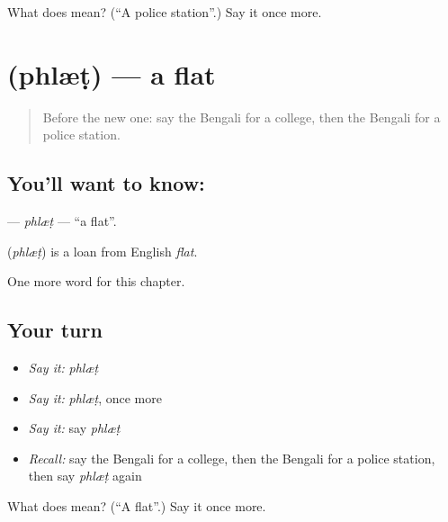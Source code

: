 \begin{tcolorbox}[breakable,colback=teal!4,colframe=teal!35!black,title={Before you move on}]
What does  mean? (\textquotedblleft{}A police station\textquotedblright{}.) Say it once more.
\end{tcolorbox}
\section[\texorpdfstring{\bn{ফ্ল্যাট} (phlæṭ)}{ফ্ল্যাট (phlæṭ)}]{ (phlæṭ) — a flat}

\label{lesson:BN-C188-phlt}



\begin{quote}
Before the new one: say the Bengali for a college, then the Bengali for a police station.
\end{quote}

\subsection*{You'll want to know: }
\textbf{} — \emph{phlæṭ} — \textquotedblleft{}a flat\textquotedblright{}.

\begin{cousinweb}
\textbf{} (\emph{phlæṭ}) is a loan from English \emph{flat}.
\end{cousinweb}

\begin{grammarlens}[title={What you've built}]
One more word for this chapter.
\end{grammarlens}

\subsection*{Your turn}
\begin{itemize}
\raggedright
  \item \emph{Say it:} \emph{phlæṭ}
  \item \emph{Say it:} \emph{phlæṭ}, once more
  \item \emph{Say it:} say \emph{phlæṭ}
  \item \emph{Recall:} say the Bengali for a college, then the Bengali for a police station, then say \emph{phlæṭ} again
\end{itemize}

\begin{tcolorbox}[breakable,colback=teal!4,colframe=teal!35!black,title={Before you move on}]
What does  mean? (\textquotedblleft{}A flat\textquotedblright{}.) Say it once more.
\end{tcolorbox}
